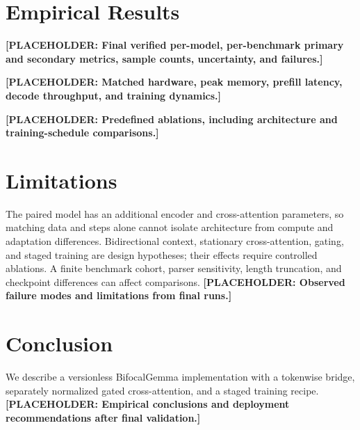 \documentclass[10pt,twocolumn]{article}
\begin{document}
\section{Empirical Results}
\textbf{[PLACEHOLDER: Final verified per-model, per-benchmark primary and secondary metrics, sample counts, uncertainty, and failures.]}

\textbf{[PLACEHOLDER: Matched hardware, peak memory, prefill latency, decode throughput, and training dynamics.]}

\textbf{[PLACEHOLDER: Predefined ablations, including architecture and training-schedule comparisons.]}
\section{Limitations}
The paired model has an additional encoder and cross-attention parameters, so matching data and steps alone cannot isolate architecture from compute and adaptation differences. Bidirectional context, stationary cross-attention, gating, and staged training are design hypotheses; their effects require controlled ablations. A finite benchmark cohort, parser sensitivity, length truncation, and checkpoint differences can affect comparisons. \textbf{[PLACEHOLDER: Observed failure modes and limitations from final runs.]}
\section{Conclusion}
We describe a versionless BifocalGemma implementation with a tokenwise bridge, separately normalized gated cross-attention, and a staged training recipe. \textbf{[PLACEHOLDER: Empirical conclusions and deployment recommendations after final validation.]}


\end{document}
